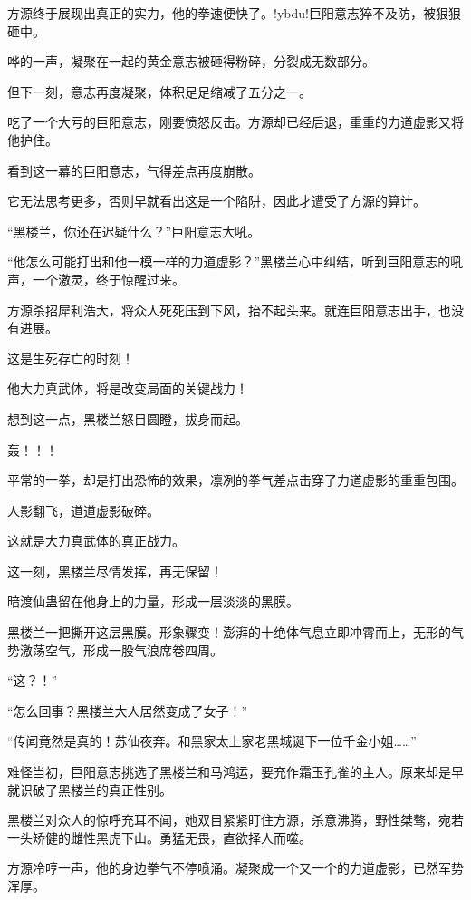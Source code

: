
\begin{this_body}

方源终于展现出真正的实力，他的拳速便快了。!ybdu!巨阳意志猝不及防，被狠狠砸中。

哗的一声，凝聚在一起的黄金意志被砸得粉碎，分裂成无数部分。

但下一刻，意志再度凝聚，体积足足缩减了五分之一。

吃了一个大亏的巨阳意志，刚要愤怒反击。方源却已经后退，重重的力道虚影又将他护住。

看到这一幕的巨阳意志，气得差点再度崩散。

它无法思考更多，否则早就看出这是一个陷阱，因此才遭受了方源的算计。

“黑楼兰，你还在迟疑什么？”巨阳意志大吼。

“他怎么可能打出和他一模一样的力道虚影？”黑楼兰心中纠结，听到巨阳意志的吼声，一个激灵，终于惊醒过来。

方源杀招犀利浩大，将众人死死压到下风，抬不起头来。就连巨阳意志出手，也没有进展。

这是生死存亡的时刻！

他大力真武体，将是改变局面的关键战力！

想到这一点，黑楼兰怒目圆瞪，拔身而起。

轰！！！

平常的一拳，却是打出恐怖的效果，凛冽的拳气差点击穿了力道虚影的重重包围。

人影翻飞，道道虚影破碎。

这就是大力真武体的真正战力。

这一刻，黑楼兰尽情发挥，再无保留！

暗渡仙蛊留在他身上的力量，形成一层淡淡的黑膜。

黑楼兰一把撕开这层黑膜。形象骤变！澎湃的十绝体气息立即冲霄而上，无形的气势激荡空气，形成一股气浪席卷四周。

“这？！”

“怎么回事？黑楼兰大人居然变成了女子！”

“传闻竟然是真的！苏仙夜奔。和黑家太上家老黑城诞下一位千金小姐……”

难怪当初，巨阳意志挑选了黑楼兰和马鸿运，要充作霜玉孔雀的主人。原来却是早就识破了黑楼兰的真正性别。

黑楼兰对众人的惊呼充耳不闻，她双目紧紧盯住方源，杀意沸腾，野性桀骜，宛若一头矫健的雌性黑虎下山。勇猛无畏，直欲择人而噬。

方源冷哼一声，他的身边拳气不停喷涌。凝聚成一个又一个的力道虚影，已然军势浑厚。


\end{this_body}
